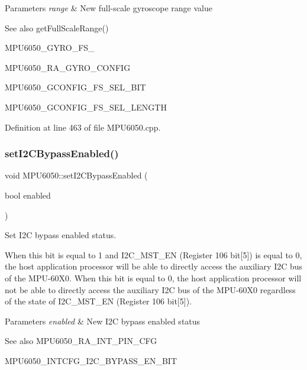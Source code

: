 \begin{DoxyParams}{Parameters}
{\em range} & New full-\/scale gyroscope range value \\
\hline
\end{DoxyParams}
\begin{DoxySeeAlso}{See also}
get\+Full\+Scale\+Range() 

M\+P\+U6050\+\_\+\+G\+Y\+R\+O\+\_\+\+F\+S\+\_ 

M\+P\+U6050\+\_\+\+R\+A\+\_\+\+G\+Y\+R\+O\+\_\+\+C\+O\+N\+F\+IG 

M\+P\+U6050\+\_\+\+G\+C\+O\+N\+F\+I\+G\+\_\+\+F\+S\+\_\+\+S\+E\+L\+\_\+\+B\+IT 

M\+P\+U6050\+\_\+\+G\+C\+O\+N\+F\+I\+G\+\_\+\+F\+S\+\_\+\+S\+E\+L\+\_\+\+L\+E\+N\+G\+TH 
\end{DoxySeeAlso}


Definition at line 463 of file M\+P\+U6050.\+cpp.

\mbox{\label{classMPU6050_aa828160756a50f414aa3f5f5f0353c70}} 
\subsubsection{\texorpdfstring{setI2CBypassEnabled()}{setI2CBypassEnabled()}}
{\footnotesize\ttfamily void M\+P\+U6050\+::set\+I2\+C\+Bypass\+Enabled (\begin{DoxyParamCaption}\item[{bool}]{enabled }\end{DoxyParamCaption})}



Set I2C bypass enabled status. 

When this bit is equal to 1 and I2\+C\+\_\+\+M\+S\+T\+\_\+\+EN (Register 106 bit\mbox{[}5\mbox{]}) is equal to 0, the host application processor will be able to directly access the auxiliary I2C bus of the M\+P\+U-\/60\+X0. When this bit is equal to 0, the host application processor will not be able to directly access the auxiliary I2C bus of the M\+P\+U-\/60\+X0 regardless of the state of I2\+C\+\_\+\+M\+S\+T\+\_\+\+EN (Register 106 bit\mbox{[}5\mbox{]}). 
\begin{DoxyParams}{Parameters}
{\em enabled} & New I2C bypass enabled status \\
\hline
\end{DoxyParams}
\begin{DoxySeeAlso}{See also}
M\+P\+U6050\+\_\+\+R\+A\+\_\+\+I\+N\+T\+\_\+\+P\+I\+N\+\_\+\+C\+FG 

M\+P\+U6050\+\_\+\+I\+N\+T\+C\+F\+G\+\_\+\+I2\+C\+\_\+\+B\+Y\+P\+A\+S\+S\+\_\+\+E\+N\+\_\+\+B\+IT 
\end{DoxySeeAlso}


